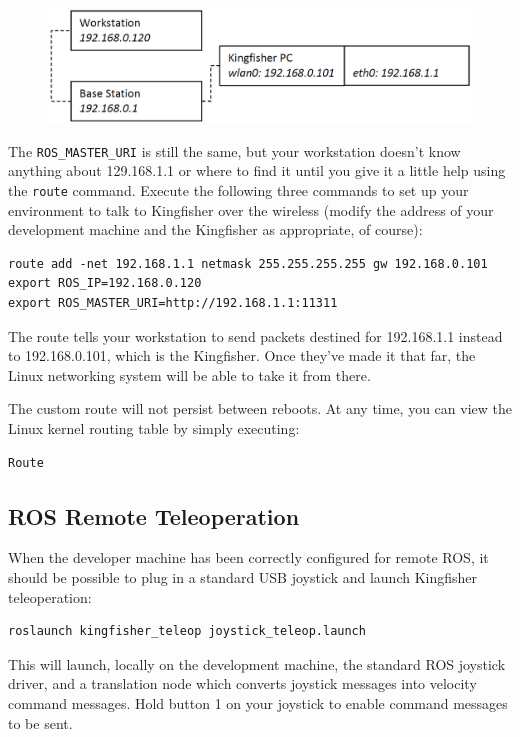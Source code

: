 \documentclass[]{clearpath-latex/clearpath-manual}
\begin{document}
\begin{figure}[h]
  \centering
  \includegraphics[width=0.75\linewidth]{kf_wireless.PNG}
  \label{kf_wireless}
\end{figure}

The \lstinline{ROS_MASTER_URI} is still the same, but your workstation doesn’t know anything about 129.168.1.1 or where to find it until you give it a little help using the \lstinline{route} command. Execute the following three commands to set up your environment to talk to Kingfisher over the wireless (modify the address of your development machine and the Kingfisher as appropriate, of course):

\begin{lstlisting}
route add -net 192.168.1.1 netmask 255.255.255.255 gw 192.168.0.101 
export ROS_IP=192.168.0.120 
export ROS_MASTER_URI=http://192.168.1.1:11311 
\end{lstlisting}

The route tells your workstation to send packets destined for 192.168.1.1 instead to 192.168.0.101, which is the Kingfisher. Once they’ve made it that far, the Linux networking system will be able to take it from there.

The custom route will not persist between reboots. At any time, you can view the Linux kernel routing table by simply executing:

\begin{lstlisting}
Route
\end{lstlisting}

\subsection{ROS Remote Teleoperation}

When the developer machine has been correctly configured for remote ROS, it should be possible to plug in a standard USB joystick and launch Kingfisher teleoperation:

\begin{lstlisting}
roslaunch kingfisher_teleop joystick_teleop.launch
\end{lstlisting}

This will launch, locally on the development machine, the standard ROS joystick driver, and a translation node which converts joystick messages into velocity command messages. Hold button 1 on your joystick to enable command messages to be sent.
\end{document}
